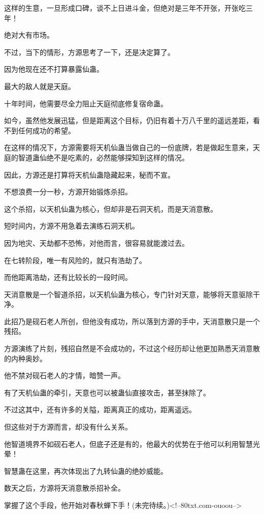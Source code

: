 \begin{this_body}
这样的生意，一旦形成口碑，谈不上日进斗金，但绝对是三年不开张，开张吃三年！

绝对大有市场。

不过，当下的情形，方源思考了一下，还是决定算了。

因为他现在还不打算暴露仙蛊。

最大的敌人就是天庭。

十年时间，他需要尽全力阻止天庭彻底修复宿命蛊。

如今，虽然他发展迅猛，但是距离这个目标，仍旧有着十万八千里的遥远差距，看不到任何成功的希望。

在这样的情况下，方源需要将天机仙蛊当做自己的一份底牌，若是做起生意来，天庭的智道蛊仙绝不是吃素的，必然能够探知到这样的情况。

因此，方源还是打算将天机仙蛊隐藏起来，秘而不宣。

不想浪费一分一秒，方源开始锻炼杀招。

这个杀招，以天机仙蛊为核心，但却非是石洞天机，而是天消意散。

短时间内，方源不用急着去演练石洞天机。

因为地灾、天劫都不恐怖，对他而言，很容易就能渡过去。

在七转阶段，唯一有风险的，就只有浩劫了。

而他距离浩劫，还有比较长的一段时间。

天消意散是一个智道杀招，以天机仙蛊为核心，专门针对天意，能够将天意驱除干净。

此招乃是砚石老人所创，但他没有成功，所以落到方源的手中，天消意散只是一个残招。

方源演练了片刻，残招自然是不会成功的，不过这个经历却让他更加熟悉天消意散的内种奥妙。

他不禁对砚石老人的才情，暗赞一声。

有了天机仙蛊的牵引，天意也可以被蛊仙直接攻击，甚至抹除了。

不过这其中，还有许多的关隘，距离真正的成功，距离遥远。

但这些对于方源而言，却没有什么关系。

他智道境界不如砚石老人，但底子还是有的，他最大的优势在于他可以利用智慧光晕！

智慧蛊在这里，再次体现出了九转仙蛊的绝妙威能。

数天之后，方源将天消意散杀招补全。

掌握了这个手段，他开始对春秋蝉下手！(未完待续。)<!--80txt.com-ouoou-->

\end{this_body}

